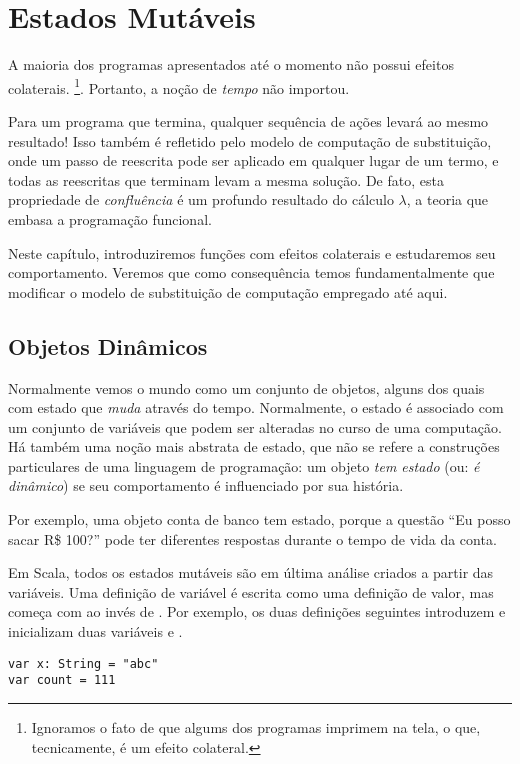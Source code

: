\chapter{Estados Mutáveis}

A maioria dos programas apresentados até o momento não possui efeitos colaterais.
\footnote{Ignoramos o fato de que algums dos programas imprimem na tela, o que, 
tecnicamente, é um efeito colateral.}.  Portanto, a noção de {\em tempo} não
importou.  

Para um programa que termina, qualquer sequência de ações levará ao mesmo resultado! Isso também é refletido
pelo modelo de computação de substituição, onde um passo de reescrita pode ser aplicado em qualquer lugar de
um termo, e todas as reescritas que terminam levam a mesma solução. De fato, esta propriedade de 
{\em confluência} é um profundo resultado do cálculo $\lambda$, a teoria que embasa a programação funcional.

Neste capítulo, introduziremos funções com efeitos colaterais e estudaremos seu comportamento. Veremos que 
como consequência temos fundamentalmente que modificar o modelo de substituição de computação empregado até aqui.

\section{Objetos Dinâmicos} 

Normalmente vemos o mundo como um conjunto de objetos, alguns dos quais com estado que {\em muda} através 
do tempo. Normalmente, o estado é associado com um conjunto de variáveis que podem ser alteradas no curso 
de uma computação. Há também uma noção mais abstrata de estado, que não se refere a construções particulares
de uma linguagem de programação: um objeto {\em tem estado} (ou: {\em é dinâmico}) se seu comportamento é 
influenciado por sua história.

Por exemplo, uma objeto conta de banco tem estado, porque a questão
``Eu posso sacar R\$ 100?''
pode ter diferentes respostas durante o tempo de vida da conta.

Em Scala, todos os estados mutáveis são em última análise criados a partir das variáveis. Uma definição de 
variável é escrita como uma definição de valor, mas começa com \verb@var@ ao invés de \verb@val@. Por exemplo, 
os duas definições seguintes introduzem e inicializam duas variáveis  e .
\begin{lstlisting}
var x: String = "abc"
var count = 111
\end{lstlisting}

